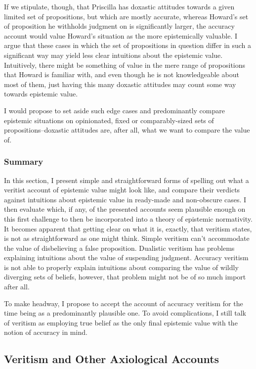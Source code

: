 \documentclass[12pt,numbers=noenddot]{scrartcl}
\begin{document}
If we stipulate, though, that Priscilla has doxastic attitudes towards a given limited set of propositions, but which are mostly accurate, whereas Howard's set of proposition he withholds judgment on is significantly larger, the accuracy account would value Howard's situation as the more epistemically valuable. I argue that these cases in which the set of propositions in question differ in such a significant way may yield less clear intuitions about the epistemic value. Intuitively, there might be something of value in the mere range of propositions that Howard is familiar with, and even though he is not knowledgeable about most of them, just having this many doxastic attitudes may count some way towards epistemic value.

I would propose to set aside such edge cases and predominantly compare epistemic situations on opinionated, fixed or comparably-sized sets of propositions–doxastic attitudes are, after all, what we want to compare the value of.

\subsubsection{Summary}

In this section, I present simple and straightforward forms of spelling out what a veritist account of epistemic value might look like, and compare their verdicts against intuitions about epistemic value in ready-made and non-obscure cases. I then evaluate which, if any, of the presented accounts seem plausible enough on this first challenge to then be incorporated into a theory of epistemic normativity. It becomes apparent that getting clear on what it is, exactly, that veritism states, is not as straightforward as one might think. Simple veritism can't accommodate the value of disbelieving a false proposition. Dualistic veritism has problems explaining intuitions about the value of suspending judgment. Accuracy veritism is not able to properly explain intuitions about comparing the value of wildly diverging sets of beliefs, however, that problem might not be of so much import after all.

To make headway, I propose to accept the account of accuracy veritism for the time being as a predominantly plausible one. To avoid complications, I still talk of veritism as employing true belief as the only final epistemic value with the notion of accuracy in mind.


\subsection{Veritism and Other Axiological Accounts}
\end{document}
